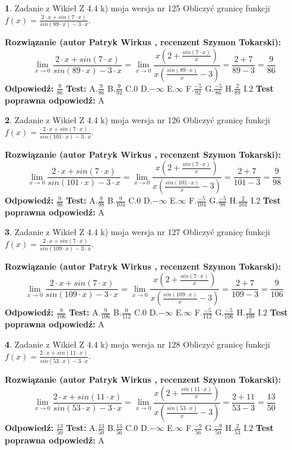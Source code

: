 \documentclass[12pt, a4paper]{article}
\theoremstyle{definition} %
\newtheorem{zad}{}
\newcommand{\zadStart}[1]{\begin{zad}#1\newline}
\newcommand{\zadStop}{\end{zad}}
\newcommand{\rozwStart}[2]{\noindent \textbf{Rozwiązanie (autor #1 , recenzent #2): }\newline}
\newcommand{\rozwStop}{\newline}
\newcommand{\odpStart}{\noindent \textbf{Odpowiedź:}\newline}
\newcommand{\odpStop}{\newline}
\newcommand{\testStart}{\noindent \textbf{Test:}\newline}
\newcommand{\testStop}{\newline}
\newcommand{\kluczStart}{\noindent \textbf{Test poprawna odpowiedź:}\newline}
\newcommand{\kluczStop}{\newline}
\begin{document}
\zadStart{Zadanie z Wikieł Z 4.4 k) moja wersja nr 125}
Obliczyć granicę funkcji $f(x)=\frac{2\cdot x +sin(7\cdot x)}{sin(89\cdot x) -3\cdot x}$.
\zadStop
\rozwStart{Patryk Wirkus}{Szymon Tokarski}
$$\lim\limits_{x\to 0}\frac{2\cdot x +sin(7\cdot x)}{sin(89\cdot x) -3\cdot x}
=\lim\limits_{x\to 0}\frac{x(2+\frac{sin(7\cdot x)}{x})}{x(\frac{sin(89\cdot x)}{x}-3)}
=\frac{2+7}{89-3} = \frac{9}{86}$$
\rozwStop
\odpStart
$\frac{9}{86}$
\odpStop
\testStart
A.$\frac{9}{86}$
B.$\frac{9}{92}$
C.$0$
D.$-\infty$
E.$\infty$
F.$\frac{-5}{92}$
G.$\frac{-5}{86}$
H.$\frac{2}{89}$
I.$2$
\testStop
\kluczStart
A
\kluczStop



\zadStart{Zadanie z Wikieł Z 4.4 k) moja wersja nr 126}
Obliczyć granicę funkcji $f(x)=\frac{2\cdot x +sin(7\cdot x)}{sin(101\cdot x) -3\cdot x}$.
\zadStop
\rozwStart{Patryk Wirkus}{Szymon Tokarski}
$$\lim\limits_{x\to 0}\frac{2\cdot x +sin(7\cdot x)}{sin(101\cdot x) -3\cdot x}
=\lim\limits_{x\to 0}\frac{x(2+\frac{sin(7\cdot x)}{x})}{x(\frac{sin(101\cdot x)}{x}-3)}
=\frac{2+7}{101-3} = \frac{9}{98}$$
\rozwStop
\odpStart
$\frac{9}{98}$
\odpStop
\testStart
A.$\frac{9}{98}$
B.$\frac{9}{104}$
C.$0$
D.$-\infty$
E.$\infty$
F.$\frac{-5}{104}$
G.$\frac{-5}{98}$
H.$\frac{2}{101}$
I.$2$
\testStop
\kluczStart
A
\kluczStop



\zadStart{Zadanie z Wikieł Z 4.4 k) moja wersja nr 127}
Obliczyć granicę funkcji $f(x)=\frac{2\cdot x +sin(7\cdot x)}{sin(109\cdot x) -3\cdot x}$.
\zadStop
\rozwStart{Patryk Wirkus}{Szymon Tokarski}
$$\lim\limits_{x\to 0}\frac{2\cdot x +sin(7\cdot x)}{sin(109\cdot x) -3\cdot x}
=\lim\limits_{x\to 0}\frac{x(2+\frac{sin(7\cdot x)}{x})}{x(\frac{sin(109\cdot x)}{x}-3)}
=\frac{2+7}{109-3} = \frac{9}{106}$$
\rozwStop
\odpStart
$\frac{9}{106}$
\odpStop
\testStart
A.$\frac{9}{106}$
B.$\frac{9}{112}$
C.$0$
D.$-\infty$
E.$\infty$
F.$\frac{-5}{112}$
G.$\frac{-5}{106}$
H.$\frac{2}{109}$
I.$2$
\testStop
\kluczStart
A
\kluczStop



\zadStart{Zadanie z Wikieł Z 4.4 k) moja wersja nr 128}
Obliczyć granicę funkcji $f(x)=\frac{2\cdot x +sin(11\cdot x)}{sin(53\cdot x) -3\cdot x}$.
\zadStop
\rozwStart{Patryk Wirkus}{Szymon Tokarski}
$$\lim\limits_{x\to 0}\frac{2\cdot x +sin(11\cdot x)}{sin(53\cdot x) -3\cdot x}
=\lim\limits_{x\to 0}\frac{x(2+\frac{sin(11\cdot x)}{x})}{x(\frac{sin(53\cdot x)}{x}-3)}
=\frac{2+11}{53-3} = \frac{13}{50}$$
\rozwStop
\odpStart
$\frac{13}{50}$
\odpStop
\testStart
A.$\frac{13}{50}$
B.$\frac{13}{56}$
C.$0$
D.$-\infty$
E.$\infty$
F.$\frac{-9}{56}$
G.$\frac{-9}{50}$
H.$\frac{2}{53}$
I.$2$
\testStop
\kluczStart
A
\kluczStop
\end{document}
